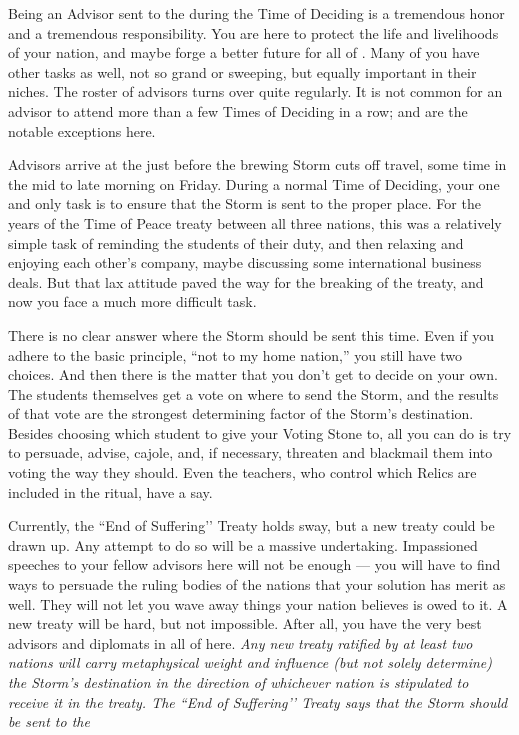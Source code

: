 \documentclass[blue]{GL2020}
\begin{document}
\name{\bAdvisorBlue{}}

Being an Advisor sent to the \pSchool{} during the Time of Deciding is a tremendous honor and a tremendous responsibility. You are here to protect the life and livelihoods of your nation, and maybe forge a better future for all of \pEarth{}. Many of you have other tasks as well, not so grand or sweeping, but equally important in their niches. The roster of advisors turns over quite regularly. It is not common for an advisor to attend more than a few Times of Deciding in a row; \cDiplomat{\full} and \cHeadDiplomat{\full} are the notable exceptions here.

Advisors arrive at the \pSc{} just before the brewing Storm cuts off travel, some time in the mid to late morning on Friday. During a normal Time of Deciding, your one and only task is to ensure that the Storm is sent to the proper place. For the years of the Time of Peace treaty between all three nations, this was a relatively simple task of reminding the students of their duty, and then relaxing and enjoying each other’s company, maybe discussing some international business deals. But that lax attitude paved the way for the breaking of the treaty, and now you face a much more difficult task.

There is no clear answer where the Storm should be sent this time. Even if you adhere to the basic principle, ``not to my home nation,'' you still have two choices. And then there is the matter that you don't get to decide on your own. The students themselves get a vote on where to send the Storm, and the results of that vote are the strongest determining factor of the Storm’s destination. Besides choosing which student to give your Voting Stone to, all you can do is try to persuade, advise, cajole, and, if necessary, threaten and blackmail them into voting the way they should. Even the teachers, who control which Relics are included in the ritual, have a say.

Currently, the ``End of Suffering’’ Treaty holds sway, but a new treaty could be drawn up. Any attempt to do so will be a massive undertaking. Impassioned speeches to your fellow advisors here will not be enough — you will have to find ways to persuade the ruling bodies of the nations that your solution has merit as well. They will not let you wave away things your nation believes is owed to it. A new treaty will be hard, but not impossible. After all, you have the very best advisors and diplomats in all of \pEarth{} here. \emph{Any new treaty ratified by at least two nations will carry metaphysical weight and influence (but not solely determine) the Storm’s destination in the direction of whichever nation is stipulated to receive it in the treaty. The ``End of Suffering’’ Treaty says that the Storm should be sent to the \pShippies{}}
\end{document}
